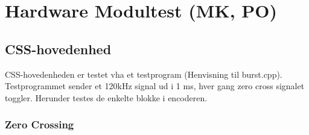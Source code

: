\section{Hardware Modultest (MK, PO)}

\subsection{CSS-hovedenhed}
CSS-hovedenheden er testet vha et testprogram (Henvisning til burst.cpp). Testprogrammet sender et 120kHz signal ud i 1 ms, hver gang zero cross signalet toggler. Herunder testes de enkelte blokke i encoderen.    

\subsubsection{Zero Crossing}

